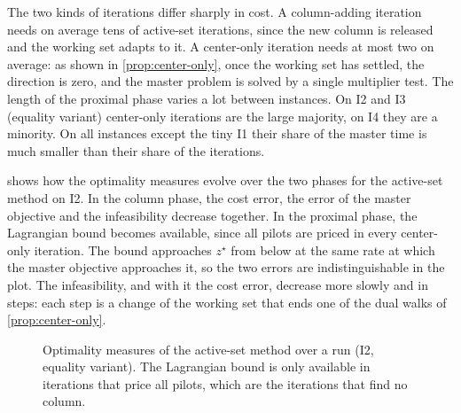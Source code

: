 The two kinds of iterations differ sharply in cost. A column-adding iteration needs on
average tens of active-set iterations, since the new column is released and the working set
adapts to it. A center-only iteration needs at most two on average: as shown in
\cref{prop:center-only}, once the working set has settled, the direction is zero, and the
master problem is solved by a single multiplier test. The length of the proximal phase
varies a lot between instances. On I2 and I3 (equality variant) center-only iterations are
the large majority, on I4 they are a minority. On all instances except the tiny I1 their share
of the master time is much smaller than their share of the iterations.

 shows how the optimality measures evolve over the two phases for the
active-set method on I2. In the column phase, the cost error, the error of the master
objective and the infeasibility decrease together. In the proximal phase, the Lagrangian
bound becomes available, since all pilots are priced in every center-only iteration. The
bound approaches $z^\star$ from below at the same rate at which the master objective
approaches it, so the two errors are indistinguishable in the plot. The infeasibility, and
with it the cost error, decrease more slowly and in steps: each step is a change of the
working set that ends one of the dual walks of \cref{prop:center-only}.

\begin{figure}[ht]
\centering
{}
\caption{Optimality measures of the active-set method over a run (I2, equality variant). The
Lagrangian bound is only available in iterations that price all pilots, which are the
iterations that find no column.}
\label{fig:optimality}
\end{figure}


